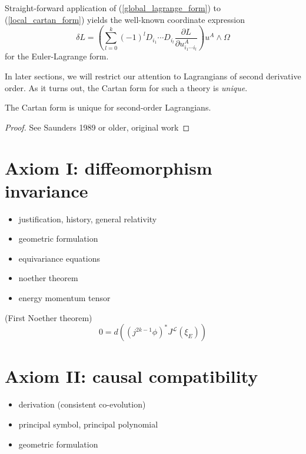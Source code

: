 Straight-forward application of (\ref{global_lagrange_form}) to (\ref{local_cartan_form}) yields the well-known coordinate expression
\begin{equation}
  \delta L = \left( \sum_{l=0}^{k} (-1)^l D_{i_1} \cdots D_{i_l} \frac{\partial L}{\partial u^A_{i_1\cdots i_l}}\right) u^A \wedge \Omega
\end{equation}
for the Euler-Lagrange form.

In later sections, we will restrict our attention to Lagrangians of second derivative order. As it turns out, the Cartan form for such a theory is \emph{unique}.
\begin{proposition}
  The Cartan form is unique for second-order Lagrangians.
\end{proposition}
\begin{proof}
  See Saunders 1989 or older, original work
\end{proof}

\section{Axiom I: diffeomorphism invariance}
\begin{itemize}
\item justification, history, general relativity
\item geometric formulation
\item equivariance equations
\item noether theorem
\item energy momentum tensor
\end{itemize}

\begin{proposition}{(First Noether theorem)}
  \begin{equation}
    0 = d \left((j^{2k-1}\phi)^\ast J^\mathcal L(\xi_E)\right)
  \end{equation}
\end{proposition}

\section{Axiom II: causal compatibility}
\begin{itemize}
\item derivation (consistent co-evolution)
\item principal symbol, principal polynomial
\item geometric formulation
\end{itemize}

